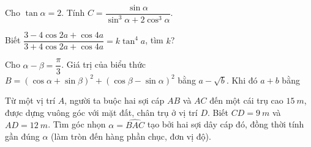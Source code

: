 \begin{ex}%
	Cho $\tan \alpha=2$. Tính $C=\dfrac{\sin \alpha}{\sin ^3 \alpha+2 \cos ^3 \alpha}$.
\end{ex}

\begin{ex}%
	Biết $\dfrac{3-4\cos 2a+\cos 4a}{3+4\cos 2a+\cos 4a}=k\tan^4a$, tìm $k$?
\end{ex}

\begin{ex}%
	Cho $\alpha-\beta=\dfrac{\pi}{3}$. Giá trị của biểu thức $B=(\cos \alpha+\sin \beta)^2+(\cos \beta-\sin \alpha)^2$ bằng $a-\sqrt{b}$. Khi đó $a+b$ bằng
\end{ex}

\begin{ex}%
	Từ một vị trí $A$, người ta buộc hai sợi cáp $A B$ và $A C$ đến một cái trụ cao $15~m$, được dựng vuông góc với mặt đất, chân trụ ở vị trí $D$. Biết $C D=9~m$ và $A D=12~m$. Tìm góc nhọn $\alpha=\widehat{B A C}$ tạo bởi hai sợi dây cáp đó, đồng thời tính gần đúng $\alpha$ (làm tròn đến hàng phần chục, đơn vị độ).
\end{ex}

